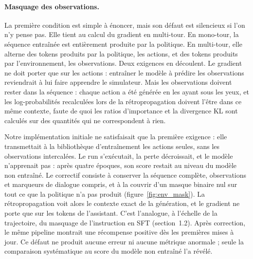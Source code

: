 \documentclass[11pt,a4paper]{article}
\begin{document}
\paragraph{Masquage des observations.} La première condition est simple à énoncer, mais son défaut est silencieux si l'on n'y pense pas. Elle tient au calcul du gradient en multi-tour. En mono-tour, la séquence entraînée est entièrement produite par la politique. En multi-tour, elle alterne des tokens produits par la politique, les actions, et des tokens produits par l'environnement, les observations. Deux exigences en découlent. Le gradient ne doit porter que sur les actions : entraîner le modèle à prédire les observations reviendrait à lui faire apprendre le simulateur. Mais les observations doivent rester dans la séquence : chaque action a été générée en les ayant sous les yeux, et les log-probabilités recalculées lors de la rétropropagation doivent l'être dans ce même contexte, faute de quoi les ratios d'importance et la divergence KL sont calculés sur des quantités qui ne correspondent à rien.

Notre implémentation initiale ne satisfaisait que la première exigence : elle transmettait à la bibliothèque d'entraînement les actions seules, sans les observations intercalées. Le run s'exécutait, la perte décroissait, et le modèle n'apprenait pas : après quatre époques, son score restait au niveau du modèle non entraîné. Le correctif consiste à conserver la séquence complète, observations et marqueurs de dialogue compris, et à la couvrir d'un masque binaire nul sur tout ce que la politique n'a pas produit (figure~\ref{fig:env_mask}). La rétropropagation voit alors le contexte exact de la génération, et le gradient ne porte que sur les tokens de l'assistant. C'est l'analogue, à l'échelle de la trajectoire, du masquage de l'instruction en SFT (section~1.2). Après correction, le même pipeline montrait une récompense positive dès les premières mises à jour. Ce défaut ne produit aucune erreur ni aucune métrique anormale ; seule la comparaison systématique au score du modèle non entraîné l'a révélé.
\end{document}
